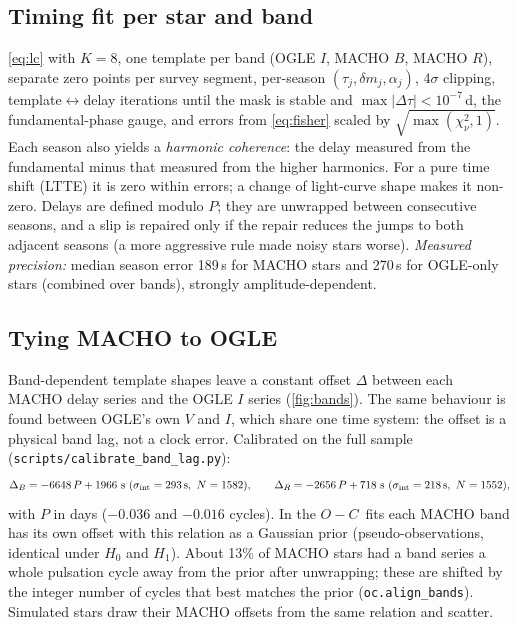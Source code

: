 \documentclass[11pt]{article}
\newcommand{\OC}{\ensuremath{O{-}C}}
\begin{document}
\subsection{Timing fit per star and band}
\cref{eq:lc} with $K=8$, one template per band (OGLE $I$, MACHO $B$, MACHO $R$), separate zero points per survey segment,
per-season $(\tau_j,\delta m_j,\alpha_j)$, $4\sigma$ clipping, template$\leftrightarrow$delay iterations until the mask is
stable and $\max|\Delta\tau|<10^{-7}$\,d, the fundamental-phase gauge, and errors from \cref{eq:fisher} scaled by
$\sqrt{\max(\chi^2_\nu,1)}$. Each season also yields a \emph{harmonic coherence}: the delay measured from the fundamental
minus that measured from the higher harmonics. For a pure time shift (LTTE) it is zero within errors; a change of light-curve
shape makes it non-zero. Delays are defined modulo $P$; they are unwrapped between consecutive seasons, and a slip is
repaired only if the repair reduces the jumps to both adjacent seasons (a more aggressive rule made noisy stars worse).
\emph{Measured precision:} median season error 189\,s for MACHO stars and 270\,s for OGLE-only stars (combined over bands),
strongly amplitude-dependent.

\subsection{Tying MACHO to OGLE}\label{sec:tie}
Band-dependent template shapes leave a constant offset $\Delta$ between each MACHO delay series and the OGLE $I$ series
(\cref{fig:bands}). The same behaviour is found between OGLE's own $V$ and $I$, which share one time system: the offset
is a physical band lag, not a clock error. Calibrated on the full sample (\texttt{scripts/calibrate\_band\_lag.py}):
\begin{equation}
\Delta_B=-6648\,P+1966\ {\rm s}\ (\sigma_{\rm int}=293\,{\rm s},\ N=1582),\qquad
\Delta_R=-2656\,P+718\ {\rm s}\ (\sigma_{\rm int}=218\,{\rm s},\ N=1552),
\end{equation}
with $P$ in days ($-0.036$ and $-0.016$ cycles). In the \OC\ fits each MACHO band has its own offset with this relation as a
Gaussian prior (pseudo-observations, identical under $H_0$ and $H_1$). About 13\% of MACHO stars had a band series a whole
pulsation cycle away from the prior after unwrapping; these are shifted by the integer number of cycles that best matches
the prior (\texttt{oc.align\_bands}). Simulated stars draw their MACHO offsets from the same relation and scatter.
\end{document}
